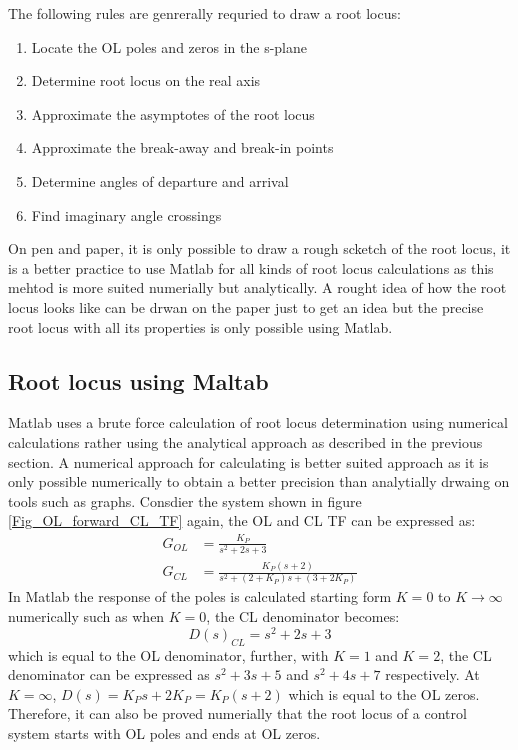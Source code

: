 The following rules are genrerally requried to draw a root locus:
\begin{enumerate}
	\item Locate the OL poles and zeros in the s-plane
	\item Determine root locus on the real axis
	\item Approximate the asymptotes of the root locus
	\item Approximate the break-away and break-in points
	\item Determine angles of departure and arrival
	\item Find imaginary angle crossings
\end{enumerate}
On pen and paper, it is only possible to draw a rough scketch of the root locus, it is a better practice to use Matlab for all kinds of root locus calculations as this mehtod is more suited numerially but analytically. A rought idea of how the root locus looks like can be drwan on the paper just to get an idea but the precise root locus with all its properties is only possible using Matlab.

\subsection{Root locus using Maltab} \label{Sec_RootLocus_Matlab}

Matlab uses a brute force calculation of root locus determination using numerical calculations rather using the analytical approach as described in the previous section. A numerical approach for calculating is better suited approach as it is only possible numerically to obtain a better precision than analytially drwaing on tools such as graphs. Consdier the system shown in figure \ref{Fig_OL_forward_CL_TF} again, the OL and CL TF can be expressed as:
\begin{align}
	G_{OL} &= \frac{K_P}{s^2 + 2s + 3} \\
	G_{CL} &= \frac{K_P(s + 2)}{s^2 + (2 + K_P)s + (3 + 2K_P)}
\end{align}
In Matlab the response of the poles is calculated starting form $K = 0$ to $K \rightarrow \infty$ numerically such as when $K = 0$, the CL denominator becomes:
\begin{equation}
	D(s)_{CL} = s^2 + 2s + 3
\end{equation}
which is equal to the OL denominator, further, with $K = 1$ and $K = 2$, the CL denominator can be expressed as $s^2 + 3s + 5$ and $s^2 + 4s + 7$ respectively. At $K = \infty$, $D(s) = K_Ps + 2 K_P = K_P(s + 2)$ which is equal to the OL zeros. Therefore, it can also be proved numerially that the root locus of a control system starts with OL poles and ends at OL zeros.

